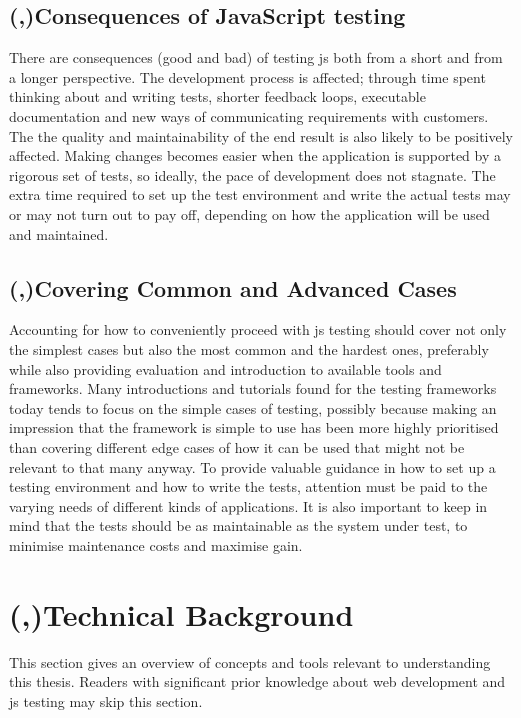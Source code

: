 \documentclass[11pt]{article}
\begin{document}
\subsection{(,)Consequences of JavaScript testing}

There are consequences (good and bad) of testing \gls{js} both from a short and from a longer perspective. The development process is affected; through time spent thinking about and writing tests, shorter feedback loops, executable documentation and new ways of communicating requirements with customers. The the quality and maintainability of the end result is also likely to be positively affected. Making changes becomes easier when the application is supported by a rigorous set of tests, so ideally, the pace of development does not stagnate. The extra time required to set up the test environment and write the actual tests may or may not turn out to pay off, depending on how the application will be used and maintained.

\subsection{(,)Covering Common and Advanced Cases}

Accounting for how to conveniently proceed with \gls{js} testing should cover not only the simplest cases but also the most common and the hardest ones, preferably while also providing evaluation and introduction to available tools and frameworks. Many introductions and tutorials found for the testing frameworks today tends to focus on the simple cases of testing, possibly because making an impression that the framework is simple to use has been more highly prioritised than covering different edge cases of how it can be used that might not be relevant to that many anyway. To provide valuable guidance in how to set up a testing environment and how to write the tests, attention must be paid to the varying needs of different kinds of applications. It is also important to keep in mind that the tests should be as maintainable as the system under test, to minimise maintenance costs and maximise gain.

\section{(,)Technical Background}

This section gives an overview of concepts and tools relevant to understanding this thesis. Readers with significant prior knowledge about web development and \gls{js} testing may skip this section.
\end{document}
